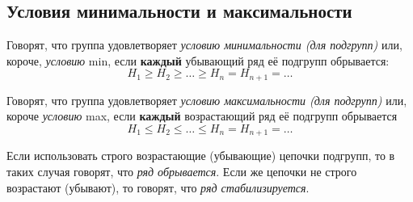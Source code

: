 \documentclass{article}
\begin{document}
\subsection{Условия минимальности и максимальности}

Говорят, что группа удовлетворяет \textit{условию минимальности (для подгрупп)} или, короче, \textit{условию} min, если \textbf{каждый} убывающий ряд её подгрупп обрывается: $$ H_1 \geqslant H_2 \geqslant \ldots \geqslant H_n = H_{n + 1} = \ldots $$

Говорят, что группа удовлетворяет \textit{условию максимальности (для подгрупп)} или, короче \textit{условию} max, если \textbf{каждый} возрастающий ряд её подгрупп обрывается $$ H_1 \leqslant H_2 \leqslant \ldots \leqslant H_n = H_{n + 1} = \ldots $$

Если использовать строго возрастающие (убывающие) цепочки подгрупп, то в таких случая говорят, что \textit{ряд обрывается}.
Если же цепочки не строго возрастают (убывают), то говорят, что \textit{ряд стабилизируется}.
\end{document}
